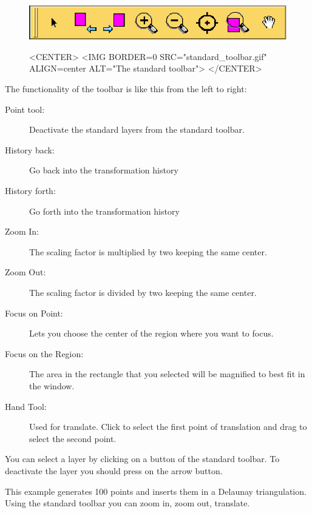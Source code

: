 \begin{figure}[h]
\begin{ccTexOnly}
\begin{center}
\includegraphics{standard_toolbar.eps} 
\end{center}
\end{ccTexOnly}
\begin{ccHtmlOnly}
<CENTER>
<IMG BORDER=0 SRC="standard_toolbar.gif"  ALIGN=center  ALT="The
standard toolbar">
</CENTER>
\end{ccHtmlOnly}
\end{figure}

The functionality of the toolbar is like this from the left to right:
\begin{description}
        \item[Point tool:] Deactivate the standard layers from the
standard toolbar.
	\item[History back:] Go back into the transformation history
	\item[History forth:] Go forth into the transformation history
        \item[Zoom In:] The scaling factor is multiplied by two
keeping the same center.
        \item[Zoom Out:] The scaling factor is divided by two keeping
the same center.
        \item[Focus on Point:] Lets you choose the center of the
region where you want to focus.
        \item[Focus on the Region:] The area in the rectangle that you selected will be magnified to best fit in the window.
        \item[Hand Tool:] Used for translate. Click to select the
first point of translation and drag to select the second point.
\end{description}

You can select a layer by clicking on a button of the standard
toolbar. To deactivate the layer you should press on the arrow button.

\ccExample
{}

This example generates 100 points and inserts them in a Delaunay
triangulation. Using the standard toolbar you can zoom in, zoom out,
translate.

